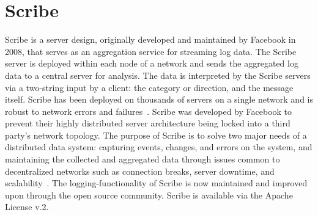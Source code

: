 \section{Scribe}

Scribe is a server design, originally developed and maintained by
Facebook in 2008, that serves as an aggregation service for streaming
log data. The Scribe server is deployed within each node of a network
and sends the aggregated log data to a central server for
analysis. The data is interpreted by the Scribe servers via a
two-string input by a client: the category or direction, and the
message itself. Scribe has been deployed on thousands of servers on a
single network and is robust to network errors and
failures~\cite{hid-sp18-507-FBScribe}. Scribe was developed by
Facebook to prevent their highly distributed server architecture being
locked into a third party's network topology. The purpose of Scribe is
to solve two major needs of a distributed data system: capturing
events, changes, and errors on the system, and maintaining the
collected and aggregated data through issues common to decentralized
networks such as connection breaks, server downtime, and
scalability~\cite{hid-sp18-507-ScribeNote}. The logging-functionality
of Scribe is now maintained and improved upon through the open source
community. Scribe is available via the Apache License v.2.
